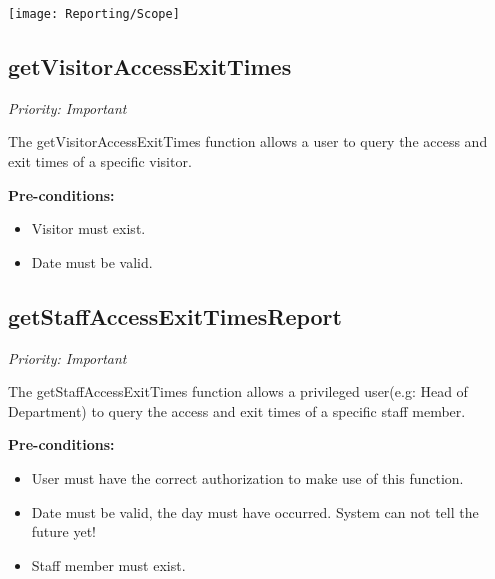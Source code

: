 \texttt{[image: Reporting/Scope]}
\subsection{getVisitorAccessExitTimes}
\textit{Priority: Important}

	The getVisitorAccessExitTimes function allows a user to query the access and exit times of a specific visitor.

		

	\textbf{Pre-conditions:}
	\begin{itemize}
		\item Visitor must exist.
		\item Date must be valid.
	\end{itemize}

\subsection{getStaffAccessExitTimesReport}
\textit{Priority: Important}

	The getStaffAccessExitTimes function allows a privileged user(e.g: Head of Department) to query the access and exit times of a specific staff member.

		
	\textbf{Pre-conditions:}
	\begin{itemize}
		\item User must have the correct authorization to make use of this function.
		\item Date must be valid, the day must have occurred. System can not tell the future yet!
		\item Staff member must exist.
	\end{itemize}

